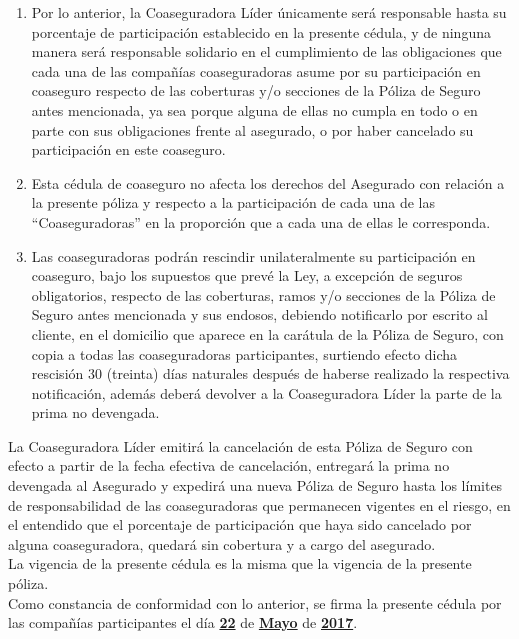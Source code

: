 \documentclass[letterpaper,10pt]{article}
\begin{document}
\begin{enumerate}
\begin{enumerate}
            \item Por lo anterior, la Coaseguradora Líder únicamente será responsable hasta su porcentaje de participación establecido en la presente cédula, y de ninguna manera será responsable solidario en el cumplimiento de las obligaciones que cada una de las compañías coaseguradoras asume por su participación en coaseguro respecto de las coberturas y/o secciones de la Póliza de Seguro antes mencionada, ya sea porque alguna de ellas no cumpla en todo o en parte con sus obligaciones frente al asegurado, o por haber cancelado su participación en este coaseguro.
            \item Esta cédula de coaseguro no afecta los derechos del Asegurado con relación a la presente póliza y respecto a la participación de cada una de las ``Coaseguradoras'' en la proporción que a cada una de ellas le corresponda.
            \item Las coaseguradoras podrán rescindir unilateralmente su participación en coaseguro, bajo los supuestos que prevé la Ley, a excepción de seguros obligatorios, respecto de las coberturas, ramos y/o secciones de la Póliza de Seguro antes mencionada y sus endosos, debiendo notificarlo por escrito al cliente, en el domicilio que aparece en la carátula de la Póliza de Seguro, con copia a todas las coaseguradoras participantes, surtiendo efecto dicha rescisión 30 (treinta) días naturales después de haberse realizado la respectiva notificación, además deberá devolver a la Coaseguradora Líder la parte de la prima no devengada.
        \end{enumerate}
\end{enumerate}

La Coaseguradora Líder emitirá la cancelación de esta Póliza de Seguro con efecto a partir de la fecha efectiva de cancelación, entregará la prima no devengada al Asegurado y expedirá una nueva Póliza de Seguro hasta los límites de responsabilidad de las coaseguradoras que permanecen vigentes en el riesgo, en el entendido que el porcentaje de participación que haya sido cancelado por alguna coaseguradora, quedará sin cobertura y a cargo del asegurado.\\

La vigencia de la presente cédula es la misma que la vigencia de la presente póliza.\\

Como constancia de conformidad con lo anterior, se firma la presente cédula por las compañías participantes el día \textbf{\underline{22}} de \textbf{\underline{Mayo}} de \textbf{\underline{2017}}.\\
\end{document}
